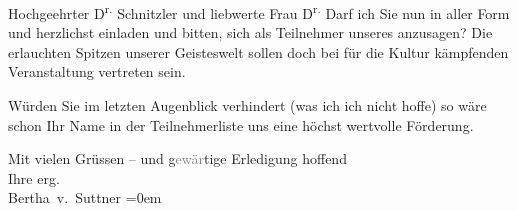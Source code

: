 \pstart{}Hochgeehrter D\textsuperscript{r.} Schnitzler und liebwerte Frau
                     D\textsuperscript{r.}\pend\vspace{0.5em}
\pstart
           Darf ich Sie nun in aller Form und herzlichst einladen und bitten, sich als
               Teilnehmer unseres \label{K_L02179-1v}\label{K_L02179-1} anzusagen? Die erlauchten
               Spitzen unserer Geisteswelt sollen doch bei für die Kultur kämpfenden Veranstaltung
               vertreten sein.\pend
           
\pstart
           Würden Sie im letzten Augenblick verhindert (was ich ich nicht hoffe) so wäre schon
               Ihr Name in der Teilnehmerliste uns eine höchst wertvolle Förderung.\pend
           
\pstart
           Mit vielen Grüssen – und g\textcolor{gray}{ewär}tige Erledigung
               hoffend{\\[\baselineskip]}Ihre erg.{\\[\baselineskip]}\spacefill\mbox{Bertha v. Suttner}\pend
           \leftskip=0em{}\endnumbering{}  \newcommand{\dateiname}{L02179}\newcommand{\titel}{Bertha von Suttner an Arthur und Olga Schnitzler, 14. 5. 1914}\newcommand{\editorInnen}{Martin Anton Müller und Gerd-Hermann Susen}
